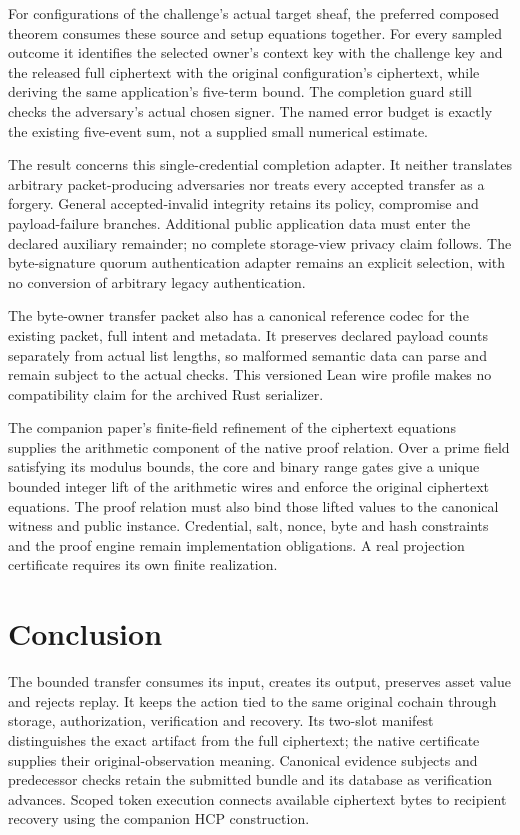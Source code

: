 For configurations of the challenge's actual target sheaf, the preferred
composed theorem consumes these source and setup equations together. For
every sampled outcome it identifies the selected owner's context key with
the challenge key and the released full ciphertext with the original
configuration's ciphertext, while deriving the same application's five-term
bound. The completion guard still checks the adversary's actual chosen signer.
The named error budget is exactly the existing five-event sum, not a supplied
small numerical estimate.

The result concerns this single-credential completion adapter. It neither
translates arbitrary packet-producing adversaries nor treats every accepted
transfer as a forgery. General accepted-invalid integrity retains its policy,
compromise and payload-failure branches. Additional public application data
must enter the declared auxiliary remainder; no complete storage-view privacy
claim follows. The byte-signature quorum authentication adapter remains an
explicit selection, with no conversion of arbitrary legacy authentication.

The byte-owner transfer packet also has a canonical reference codec for the
existing packet, full intent and metadata. It preserves declared payload
counts separately from actual list lengths, so malformed semantic data can
parse and remain subject to the actual checks. This versioned Lean wire
profile makes no compatibility claim for the archived Rust serializer.

The companion paper's finite-field refinement of the ciphertext
equations~\cite{vanderVlugt2026hcp} supplies the arithmetic component of the
native proof relation. Over a prime field satisfying its modulus bounds, the
core and binary range gates give a unique bounded integer lift of the
arithmetic wires and enforce the original ciphertext equations.
The proof relation must also bind those lifted values to the canonical
witness and public instance. Credential, salt, nonce, byte and hash constraints
and the proof engine remain implementation obligations. A real projection
certificate requires its own finite realization.

\section{Conclusion}

The bounded transfer consumes its input, creates its output, preserves asset
value and rejects replay. It keeps the action tied to the same original
cochain through storage, authorization, verification and recovery. Its two-slot
manifest distinguishes the exact artifact from the full ciphertext; the
native certificate supplies their original-observation meaning. Canonical
evidence subjects and predecessor checks retain the submitted bundle and
its database as verification advances. Scoped token execution connects
available ciphertext bytes to recipient recovery using the companion HCP
construction.

